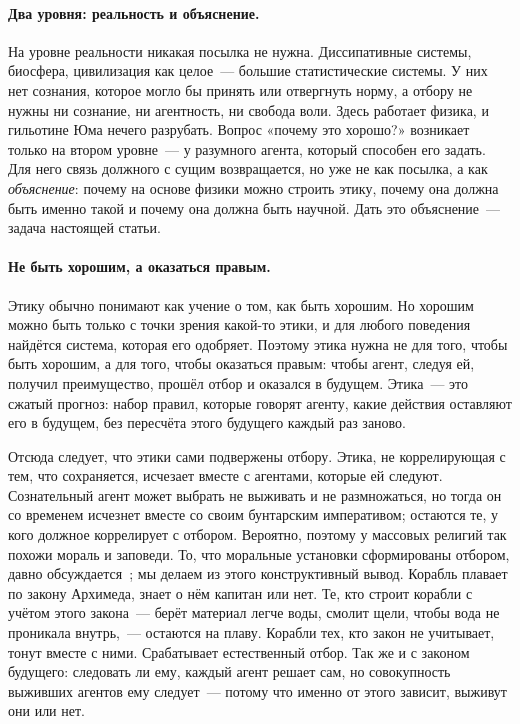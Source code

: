 \documentclass[11pt,a4paper]{article}
\begin{document}
\paragraph{Два уровня: реальность и объяснение.}
На уровне реальности никакая посылка не нужна. Диссипативные системы, биосфера, цивилизация как целое~--- большие статистические системы. У них нет сознания, которое могло бы принять или отвергнуть норму, а отбору не нужны ни сознание, ни агентность, ни свобода воли. Здесь работает физика, и гильотине Юма нечего разрубать. Вопрос «почему это хорошо?» возникает только на втором уровне~--- у разумного агента, который способен его задать. Для него связь должного с сущим возвращается, но уже не как посылка, а как \emph{объяснение}: почему на основе физики можно строить этику, почему она должна быть именно такой и почему она должна быть научной. Дать это объяснение~--- задача настоящей статьи.

\paragraph{Не быть хорошим, а оказаться правым.}
Этику обычно понимают как учение о том, как быть хорошим. Но хорошим можно быть только с точки зрения какой-то этики, и для любого поведения найдётся система, которая его одобряет. Поэтому этика нужна не для того, чтобы быть хорошим, а для того, чтобы оказаться правым: чтобы агент, следуя ей, получил преимущество, прошёл отбор и оказался в будущем. Этика~--- это сжатый прогноз: набор правил, которые говорят агенту, какие действия оставляют его в будущем, без пересчёта этого будущего каждый раз заново.

Отсюда следует, что этики сами подвержены отбору. Этика, не коррелирующая с тем, что сохраняется, исчезает вместе с агентами, которые ей следуют. Сознательный агент может выбрать не выживать и не размножаться, но тогда он со временем исчезнет вместе со своим бунтарским императивом; остаются те, у кого должное коррелирует с отбором. Вероятно, поэтому у массовых религий так похожи мораль и заповеди. То, что моральные установки сформированы отбором, давно обсуждается~\cite{ruse1986,street2006}; мы делаем из этого конструктивный вывод. Корабль плавает по закону Архимеда, знает о нём капитан или нет. Те, кто строит корабли с учётом этого закона~--- берёт материал легче воды, смолит щели, чтобы вода не проникала внутрь,~--- остаются на плаву. Корабли тех, кто закон не учитывает, тонут вместе с ними. Срабатывает естественный отбор. Так же и с законом будущего: следовать ли ему, каждый агент решает сам, но совокупность выживших агентов ему следует~--- потому что именно от этого зависит, выживут они или нет.
\end{document}
